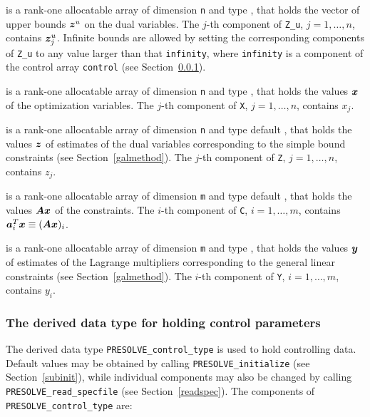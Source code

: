 \documentclass{galahad}
\newcommand{\packagename}{PRESOLVE}
\begin{document}
\begin{description}
 is a rank-one allocatable array of dimension {\tt n} and type
\realdp, that holds
the vector of upper bounds ${\bm{z}}^{u}$ on the dual variables.
The $j$-th component of {\tt Z\_u}, $j = 1, \ldots , n$,
contains ${\bm{z}}_{j}^{u}$.
Infinite bounds are allowed by setting the corresponding
components of {\tt Z\_u} to any value larger than that {\tt infinity},
where {\tt infinity} is a component of the control array {\tt control}
(see Section~\ref{typecontrol}).

 is a rank-one allocatable array of dimension {\tt n} and type
\realdp,
that holds the values ${\bm{x}}$ of the optimization variables.
The $j$-th component of {\tt X}, $j = 1,  \ldots , n$, contains $x_{j}$.

 is a rank-one allocatable array of dimension {\tt n} and type default
\realdp, that holds
the values ${\bm{z}}$ of estimates  of the dual variables
corresponding to the simple bound constraints (see Section~\ref{galmethod}).
The $j$-th component of {\tt Z}, $j = 1,  \ldots ,  n$, contains $z_{j}$.

 is a rank-one allocatable array of dimension {\tt m} and type default
\realdp, that holds
the values ${\bm{A}} {\bm{x}}$ of the constraints.
The $i$-th component of {\tt C}, $i = 1,  \ldots ,  m$, contains
${\bm{a}}_{i}^{T}{\bm{x}} \equiv ({\bm{A}} {\bm{x}})_{i}$.

 is a rank-one allocatable array of dimension {\tt m} and type
\realdp, that holds
the values ${\bm{y}}$ of estimates  of the Lagrange multipliers
corresponding to the general linear constraints (see Section~\ref{galmethod}).
The $i$-th component of {\tt Y}, $i = 1,  \ldots ,  m$, contains $y_{i}$.

\end{description}



\subsubsection{The derived data type for holding control
 parameters}\label{typecontrol}
The derived data type
{\tt \packagename\_control\_type}
is used to hold controlling data. Default values may be obtained by calling
{\tt \packagename\_initialize} (see Section~\ref{subinit}),
while individual components may also be changed by calling
{\tt \packagename\_read\-\_specfile}
(see Section~\ref{readspec}).
The components of
{\tt \packagename\_control\_type}
are:
\end{document}

